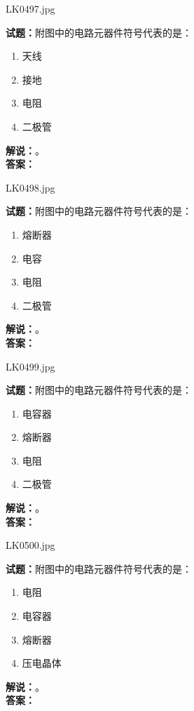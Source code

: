 \documentclass{ctexbook}
\begin{document}
\bigskip

LK0497.jpg

\noindent\textbf{试题：}附图中的电路元器件符号代表的是：
\begin{enumerate}[leftmargin=3em]
  \item 天线
  \item 接地
  \item 电阻
  \item 二极管
\end{enumerate}
\noindent\textbf{解说：}\textbf{}。\\\noindent\textbf{答案：}

\bigskip

LK0498.jpg

\noindent\textbf{试题：}附图中的电路元器件符号代表的是：
\begin{enumerate}[leftmargin=3em]
  \item 熔断器
  \item 电容
  \item 电阻
  \item 二极管
\end{enumerate}
\noindent\textbf{解说：}\textbf{}。\\\noindent\textbf{答案：}

\bigskip

LK0499.jpg

\noindent\textbf{试题：}附图中的电路元器件符号代表的是：
\begin{enumerate}[leftmargin=3em]
  \item 电容器
  \item 熔断器
  \item 电阻
  \item 二极管
\end{enumerate}
\noindent\textbf{解说：}\textbf{}。\\\noindent\textbf{答案：}

\bigskip

LK0500.jpg

\noindent\textbf{试题：}附图中的电路元器件符号代表的是：
\begin{enumerate}[leftmargin=3em]
  \item 电阻
  \item 电容器
  \item 熔断器
  \item 压电晶体
\end{enumerate}
\noindent\textbf{解说：}\textbf{}。\\\noindent\textbf{答案：}

\bigskip
\end{document}
